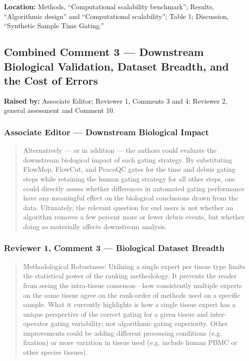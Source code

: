 \documentclass[
  11pt,
  a4paper,
]{article}
\begin{document}
\textbf{Location:} Methods, ``Computational scalability benchmark'';
Results, ``Algorithmic design'' and ``Computational scalability''; Table
1; Discussion, ``Synthetic Sample Time Gating.''

\subsection{Combined Comment 3 --- Downstream Biological Validation,
Dataset Breadth, and the Cost of
Errors}\label{combined-comment-3--downstream-biological-validation-dataset-breadth-and-the-cost-of-errors}

\textbf{Raised by:} Associate Editor; Reviewer 1, Comments 3 and 4;
Reviewer 2, general assessment and Comment 10.

\subsubsection{Associate Editor --- Downstream Biological
Impact}\label{associate-editor--downstream-biological-impact}

\begin{quote}
Alternatively --- or in addition --- the authors could evaluate the
downstream biological impact of each gating strategy. By substituting
FlowMop, FlowCut, and PeacoQC gates for the time and debris gating steps
while retaining the human gating strategy for all other steps, one could
directly assess whether differences in automated gating performance have
any meaningful effect on the biological conclusions drawn from the data.
Ultimately, the relevant question for end users is not whether an
algorithm removes a few percent more or fewer debris events, but whether
doing so materially affects downstream analysis.
\end{quote}

\subsubsection{Reviewer 1, Comment 3 --- Biological Dataset
Breadth}\label{reviewer-1-comment-3--biological-dataset-breadth}

\begin{quote}
Methodological Robustness: Utilizing a single expert per tissue type
limits the statistical power of the ranking methodology. It prevents the
reader from seeing the intra-tissue consensus---how consistently
multiple experts on the same tissue agree on the rank-order of methods
used on a specific sample. What it currently highlights is how a single
tissue expert has a unique perspective of the correct gating for a given
tissue and inter-operator gating variability; not algorithmic gating
superiority. Other improvements could be adding different processing
conditions (e.g. fixation) or more variation in tissue used (e.g.
include human PBMC or other species\textquotesingle{} tissues).
\end{quote}
\end{document}
